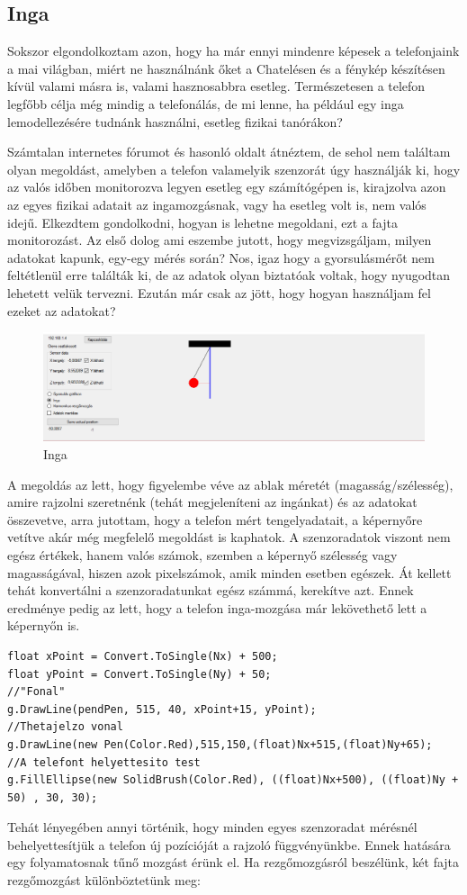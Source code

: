 \documentclass{thesis-ekf}
\theoremstyle{definition}
\theoremstyle{remark}
\begin{document}
\subsection{Inga}
Sokszor elgondolkoztam azon, hogy ha már ennyi mindenre képesek a telefonjaink a mai világban, miért ne használnánk őket a Chatelésen és a fénykép készítésen kívül valami másra is, valami hasznosabbra esetleg. Természetesen a telefon legfőbb célja még mindig a telefonálás, de mi lenne, ha például egy inga lemodellezésére tudnánk használni, esetleg fizikai tanórákon?
\par Számtalan internetes fórumot és hasonló oldalt átnéztem, de sehol nem találtam olyan megoldást, amelyben a telefon valamelyik szenzorát úgy használják ki, hogy az valós időben monitorozva legyen esetleg egy számítógépen is, kirajzolva azon az egyes fizikai adatait az ingamozgásnak, vagy ha esetleg volt is, nem valós idejű. Elkezdtem gondolkodni, hogyan is lehetne megoldani, ezt a fajta monitorozást. Az első dolog ami eszembe jutott, hogy megvizsgáljam, milyen adatokat kapunk, egy-egy mérés során? Nos, igaz hogy a gyorsulásmérőt nem feltétlenül erre találták ki, de az adatok olyan biztatóak voltak, hogy nyugodtan lehetett velük tervezni. Ezután már csak az jött, hogy hogyan használjam fel ezeket az adatokat?
\begin{figure}[!h]
	\centering
	\includegraphics[width=15cm]{inga}
	\caption{Inga}\label{inga}
\end{figure}
\par A megoldás az lett, hogy figyelembe véve az ablak méretét (magasság/szélesség), amire rajzolni szeretnénk (tehát megjeleníteni az ingánkat) és az adatokat összevetve, arra jutottam, hogy a telefon mért tengelyadatait, a képernyőre vetítve akár még megfelelő megoldást is kaphatok. A szenzoradatok viszont nem egész értékek, hanem valós számok, szemben a képernyő szélesség vagy magasságával, hiszen azok pixelszámok, amik minden esetben egészek. Át kellett tehát konvertálni a szenzoradatunkat egész számmá, kerekítve azt. Ennek eredménye pedig az lett, hogy a telefon inga-mozgása már lekövethető lett a képernyőn is. 
 \begin{lstlisting}
float xPoint = Convert.ToSingle(Nx) + 500;
float yPoint = Convert.ToSingle(Ny) + 50;
//"Fonal"
g.DrawLine(pendPen, 515, 40, xPoint+15, yPoint);
//Thetajelzo vonal
g.DrawLine(new Pen(Color.Red),515,150,(float)Nx+515,(float)Ny+65);
//A telefont helyettesito test
g.FillEllipse(new SolidBrush(Color.Red), ((float)Nx+500), ((float)Ny + 50) , 30, 30);
 \end{lstlisting}
 \par Tehát lényegében annyi történik, hogy minden egyes szenzoradat mérésnél behelyettesítjük a telefon új pozícióját a rajzoló függvényünkbe. Ennek hatására egy folyamatosnak tűnő mozgást érünk el. Ha rezgőmozgásról beszélünk, két fajta rezgőmozgást különböztetünk meg:
\end{document}
